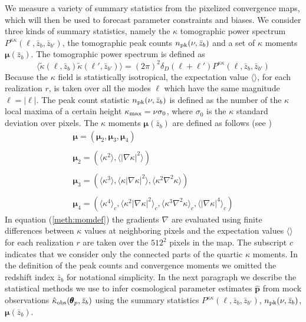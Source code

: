 \documentclass[reprint,aps,prd,superscriptaddress,showkeys,showpacs]{revtex4-1}
\newcommand{\bbh}[1]{\mathbf{\hat{#1}}}
\newcommand{\h}[1]{\hat{#1}}
\begin{document}
We measure a variety of summary statistics from the pixelized convergence maps, which will then be used to forecast parameter constraints and biases. We consider three kinds of summary statistics, namely the $\kappa$ tomographic power spectrum $P^{\kappa\kappa}(\ell,\bar{z}_b,\bar{z}_{b'})$, the tomographic peak counts $n_{\rm pk}(\nu,\bar{z}_b)$ and a set of $\kappa$ moments $\pmb{\mu}(\bar{z}_b)$. The tomographic power spectrum is defined as 
\begin{equation}
\langle\tilde{\kappa}(\pmb{\ell},\bar{z}_b)\tilde{\kappa}(\pmb{\ell}',\bar{z}_{b'})\rangle = (2\pi)^2\delta_D(\pmb{\ell}+\pmb{\ell}')P^{\kappa\kappa}(\ell,\bar{z}_b,\bar{z}_{b'})
\end{equation}
%
Because the $\kappa$ field is statistically isotropical, the expectation value $\langle\rangle$, for each realization $r$, is taken over all the modes $\pmb{\ell}$ which have the same magnitude $\ell=\vert\pmb{\ell}\vert$. The peak count statistic $n_{\rm pk}(\nu,\bar{z}_b)$ is defined as the number of the $\kappa$ local maxima of a certain height $\kappa_{\rm max}=\nu\sigma_0$, where $\sigma_0$ is the $\kappa$ standard deviation over pixels. The $\kappa$ moments $\pmb{\mu}(\bar{z}_b)$ are defined as follows (see \citep{Matsubara10,Munshi12,MinkPetri}) 
%
\begin{equation}
\label{meth:momdef}
\begin{matrix}
\pmb{\mu} = (\pmb{\mu}_2,\pmb{\mu}_3,\pmb{\mu}_4) \\ \\
\pmb{\mu}_2 = (\langle\kappa^2\rangle,\langle\vert\nabla\kappa\vert^2\rangle) \\ \\
\pmb{\mu}_3 = (\langle\kappa^3\rangle,\langle\kappa\vert\nabla\kappa\vert^2\rangle,\langle\kappa^2\nabla^2\kappa\rangle) \\ \\
\pmb{\mu}_4 = (\langle\kappa^4\rangle_c,\langle\kappa^2\vert\nabla\kappa\vert^2\rangle_c,\langle\kappa^3\nabla^2\kappa\rangle_c,\langle\vert\nabla\kappa\vert^4\rangle_c)
\end{matrix}
\end{equation}
%
In equation (\ref{meth:momdef}) the gradients $\nabla$ are evaluated using finite differences between $\kappa$ values at neighboring pixels and the expectation values $\langle\rangle$ for each realization $r$ are taken over the $512^2$ pixels in the map. The subscript $c$ indicates that we consider only the connected parts of the quartic $\kappa$ moments. In the definition of the peak counts and convergence moments we omitted the redshift index $\bar{z}_b$ for notational simplicity. In the next paragraph we describe the statistical methods we use to infer cosmological parameter estimates $\bbh{p}$ from mock observations $\h{\kappa}_{\rm obs}(\pmb{\theta}_p,\bar{z}_b)$ using the summary statistics $P^{\kappa\kappa}(\ell,\bar{z}_b,\bar{z}_{b'})$, $n_{\rm pk}(\nu,\bar{z}_b)$, $\pmb{\mu}(\bar{z}_b)$.   
\end{document}
